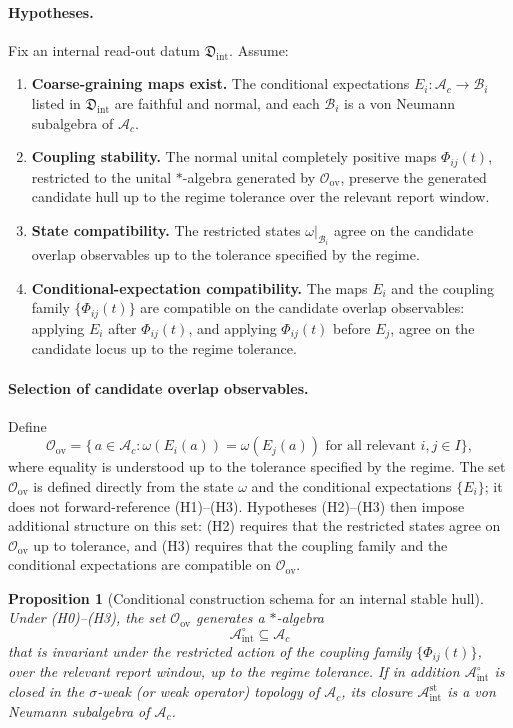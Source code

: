 \documentclass[12pt]{article}
\newtheorem{proposition}{Proposition}[section]
\theoremstyle{definition}
\theoremstyle{remark}
\newcommand{\Ac}{\mathcal A_c}
\newcommand{\Bint}{\mathcal A_{\mathrm{int}}^{\mathrm{st}}}
\newcommand{\Bintpre}{\mathcal A_{\mathrm{int}}^{\circ}}
\begin{document}
\paragraph{Hypotheses.}
Fix an internal read-out datum \(\mathfrak D_{\mathrm{int}}\). Assume:
\begin{enumerate}[label=(H\arabic*)]
\item[(H0)] \textbf{Coarse-graining maps exist.} The conditional
expectations \(E_i:\Ac\to\mathcal B_i\) listed in
\(\mathfrak D_{\mathrm{int}}\) are faithful and normal, and each
\(\mathcal B_i\) is a von Neumann subalgebra of \(\Ac\).
\item \textbf{Coupling stability.} The normal unital completely positive
maps \(\Phi_{ij}(t)\), restricted to the unital \(*\)-algebra generated
by \(\mathcal O_{\mathrm{ov}}\), preserve the generated candidate hull
up to the regime tolerance over the relevant report window.
\item \textbf{State compatibility.} The restricted states
\(\omega|_{\mathcal B_i}\) agree on the candidate overlap observables
up to the tolerance specified by the regime.
\item \textbf{Conditional-expectation compatibility.} The maps \(E_i\) and the
coupling family \(\{\Phi_{ij}(t)\}\) are compatible on the candidate
overlap observables: applying \(E_i\) after \(\Phi_{ij}(t)\), and
applying \(\Phi_{ij}(t)\) before \(E_j\), agree on the candidate locus
up to the regime tolerance.
\end{enumerate}

\paragraph{Selection of candidate overlap observables.}
Define
\[
\mathcal O_{\mathrm{ov}}
=
\bigl\{\,a\in\Ac :
\omega(E_i(a)) = \omega(E_j(a))
\text{ for all relevant }i,j\in I
\bigr\},
\]
where equality is understood up to the tolerance specified by the
regime. The set \(\mathcal O_{\mathrm{ov}}\) is defined directly from
the state \(\omega\) and the conditional expectations \(\{E_i\}\); it
does not forward-reference (H1)--(H3). Hypotheses (H2)--(H3) then
impose additional structure on this set: (H2) requires that the
restricted states agree on \(\mathcal O_{\mathrm{ov}}\) up to
tolerance, and (H3) requires that the coupling family and the
conditional expectations are compatible on \(\mathcal O_{\mathrm{ov}}\).

\begin{proposition}[Conditional construction schema for an internal stable hull]
\label{prop:conditional-construction}
Under (H0)--(H3), the set \(\mathcal O_{\mathrm{ov}}\) generates a
\(*\)-algebra
\[
\Bintpre
\subseteq \Ac
\]
that is invariant under the restricted action of the coupling family
\(\{\Phi_{ij}(t)\}\), over the relevant report window, up to the regime
tolerance. If in addition
\(\Bintpre\) is closed in the \(\sigma\)-weak (or weak operator)
topology of \(\Ac\), its closure
\(\Bint\) is a von Neumann subalgebra of \(\Ac\).
\end{proposition}
\end{document}
